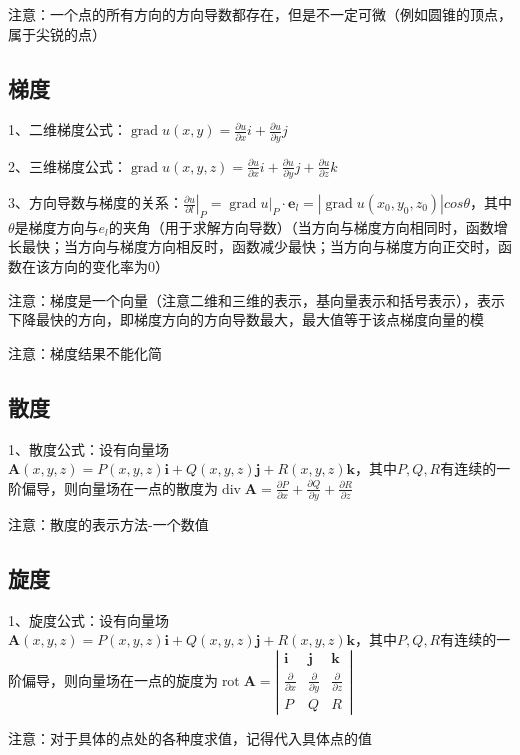 注意：一个点的所有方向的方向导数都存在，但是不一定可微（例如圆锥的顶点，属于尖锐的点）



\subsection{梯度}

1、二维梯度公式：$\operatorname{grad} u(x, y)=\frac{\partial u}{\partial x} i+\frac{\partial u}{\partial y} j$

2、三维梯度公式：$\operatorname{grad} u(x, y, z)=\frac{\partial u}{\partial x} i+\frac{\partial u}{\partial y} j+\frac{\partial u}{\partial z} k$

3、方向导数与梯度的关系：$\left.\frac{\partial u}{\partial{l}}\right|_{P}=\left.\operatorname{grad} u\right|_{P} \cdot \boldsymbol{e}_{l}=|\operatorname{grad} u(x_0, y_0, z_0) |cos \theta$，其中$\theta$是梯度方向与$e_l$的夹角（用于求解方向导数）（当方向与梯度方向相同时，函数增长最快；当方向与梯度方向相反时，函数减少最快；当方向与梯度方向正交时，函数在该方向的变化率为0）

注意：梯度是一个向量（注意二维和三维的表示，基向量表示和括号表示），表示下降最快的方向，即梯度方向的方向导数最大，最大值等于该点梯度向量的模

注意：梯度结果不能化简



\subsection{散度}

1、散度公式：设有向量场$\boldsymbol{A}(x, y, z)=P(x, y, z) \boldsymbol{i}+Q(x, y, z) \boldsymbol{j}+R(x, y, z) \boldsymbol{k}$，其中$P,Q,R$有连续的一阶偏导，则向量场在一点的散度为$\operatorname{div} \boldsymbol{A}=\frac{\partial P}{\partial x}+\frac{\partial Q}{\partial y}+\frac{\partial R}{\partial z}$

注意：散度的表示方法-一个数值



\subsection{旋度}

1、旋度公式：设有向量场$\boldsymbol{A}(x, y, z)=P(x, y, z) \boldsymbol{i}+Q(x, y, z) \boldsymbol{j}+R(x, y, z) \boldsymbol{k}$，其中$P,Q,R$有连续的一阶偏导，则向量场在一点的旋度为$\operatorname{rot} \boldsymbol{A}=\left|\begin{array}{ccc}\boldsymbol{i} & \boldsymbol{j} & \boldsymbol{k} \\\frac{\partial}{\partial x} & \frac{\partial}{\partial y} & \frac{\partial}{\partial z} \\P & Q & R\end{array}\right|$

注意：对于具体的点处的各种度求值，记得代入具体点的值

